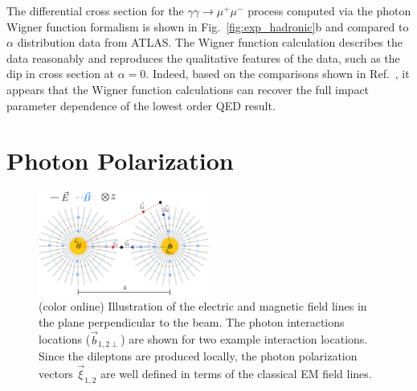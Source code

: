 \documentclass[twocolumn,epjc3]{svjour3}\sloppy
\begin{document}
The differential cross section for the $\gamma\gamma \rightarrow \mu^+\mu^-$ process computed via the photon Wigner function formalism is shown in Fig.~\ref{fig:exp_hadronic}b and compared to $\alpha$ distribution data from ATLAS. The Wigner function calculation describes the data reasonably and reproduces the qualitative features of the data, such as the dip in cross section at $\alpha=0$. Indeed, based on the comparisons shown in Ref.~\cite{klusek-gawendaCentralityDependenceDilepton2021,Wang:2021kxm}, it appears that the Wigner function calculations can recover the full impact parameter dependence of the lowest order QED result. 

\section{Photon Polarization}
\label{sec:polarization}

\begin{figure}
    \centering
    \includegraphics[width=0.5\textwidth]{fig/photonphoton_polarization_wide-crop.pdf}
    \caption{ (color online) Illustration of the electric and magnetic field lines in the plane perpendicular to the beam. The photon interactions locations ($\vec{b}_{1,2\perp}$) are shown for two example interaction locations. Since the dileptons are produced locally, the photon polarization vectors $\vec{\xi}_{1,2}$ are well defined in terms of the classical EM field lines. }
    \label{fig:illustration}
\end{figure}
\end{document}
